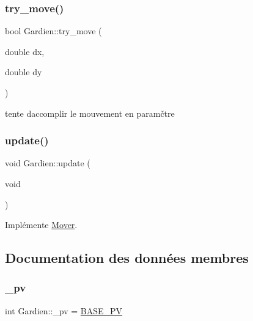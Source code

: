 \mbox{\label{classGardien_a851adaf99e906da7469567829893b8f4}} 
\subsubsection{\texorpdfstring{try\+\_\+move()}{try\_move()}}
{\footnotesize\ttfamily bool Gardien\+::try\+\_\+move (\begin{DoxyParamCaption}\item[{double}]{dx,  }\item[{double}]{dy }\end{DoxyParamCaption})\hspace{0.3cm}{\ttfamily [private]}}



tente d\textquotesingle{}accomplir le mouvement en paramčtre 

\mbox{\label{classGardien_aed498f0d6bbb526e0373a914ba6bf9aa}} 
\subsubsection{\texorpdfstring{update()}{update()}}
{\footnotesize\ttfamily void Gardien\+::update (\begin{DoxyParamCaption}\item[{void}]{ }\end{DoxyParamCaption})\hspace{0.3cm}{\ttfamily [virtual]}}



Implémente \hyperlink{classMover_a77684ae3483af98c82c9488ef3e80f05}{Mover}.



\subsection{Documentation des données membres}
\mbox{\label{classGardien_a252683c50522c13f9604bea387d1af34}} 
\subsubsection{\texorpdfstring{\+\_\+pv}{\_pv}}
{\footnotesize\ttfamily int Gardien\+::\+\_\+pv = \hyperlink{classGardien_a1832c02b32c6e47b240536fd6ba47812}{B\+A\+S\+E\+\_\+\+PV}\hspace{0.3cm}{\ttfamily [private]}}



